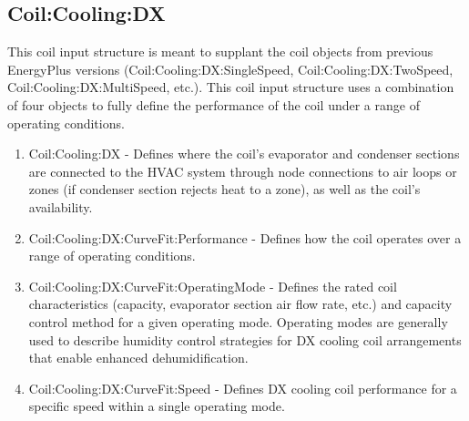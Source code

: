 \subsection{Coil:Cooling:DX}\label{coilcoolingdx}

This coil input structure is meant to supplant the coil objects from previous EnergyPlus versions (Coil:Cooling:DX:SingleSpeed, Coil:Cooling:DX:TwoSpeed, Coil:Cooling:DX:MultiSpeed, etc.). This coil input structure uses a combination of four objects to fully define the performance of the coil under a range of operating conditions.

\begin{enumerate}
\def\labelenumi{\arabic{enumi}.}
\item
 Coil:Cooling:DX - Defines where the coil's evaporator and condenser sections are connected to the HVAC system through node connections to air loops or zones (if condenser section rejects heat to a zone), as well as the coil's availability.
\item
 Coil:Cooling:DX:CurveFit:Performance - Defines how the coil operates over a range of operating conditions.
\item
 Coil:Cooling:DX:CurveFit:OperatingMode - Defines the rated coil characteristics (capacity, evaporator section air flow rate, etc.) and capacity control method for a given operating mode. Operating modes are generally used to describe humidity control strategies for DX cooling coil arrangements that enable enhanced dehumidification. 
\item
 Coil:Cooling:DX:CurveFit:Speed - Defines DX cooling coil performance for a specific speed within a single operating mode.

\end{enumerate}
